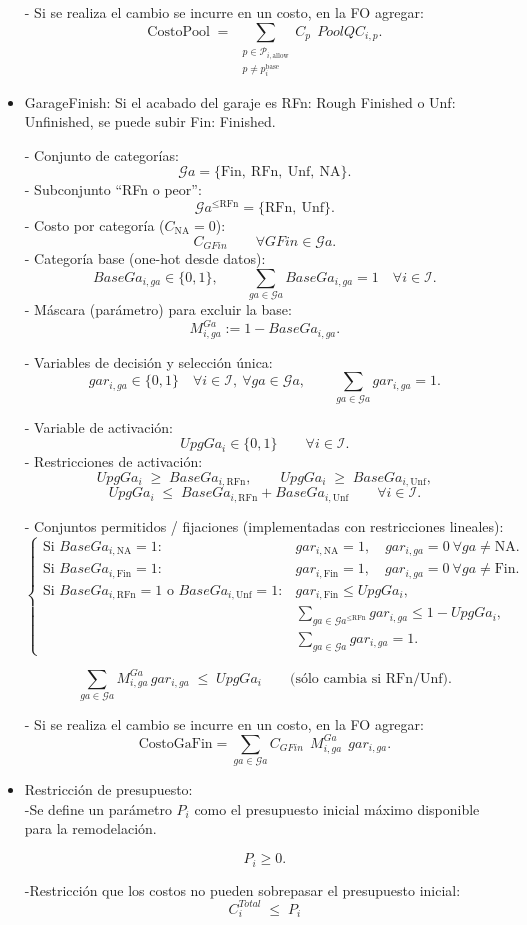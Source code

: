 \begin{itemize}
- Si se realiza el cambio se incurre en un costo, en la FO agregar:
\[
  \text{CostoPool}
  \;=\;
  \sum_{\substack{p \in \mathcal{P}_{i,\text{allow}} \\ p \neq p_i^{\text{base}}}}
  C_p \;\, PoolQC_{i,p}.
\]

    \item GarageFinish: Si el acabado del garaje es RFn: Rough Finished o Unf: Unfinished, se puede subir Fin: Finished. 

- Conjunto de categorías:
\[
  \mathcal{G}a=\{\text{Fin},\ \text{RFn},\ \text{Unf},\ \text{NA}\}.
\]
- Subconjunto “RFn o peor”:
\[
  \mathcal{G}a^{\le \text{RFn}}=\{\text{RFn},\ \text{Unf}\}.
\]
- Costo por categoría ($C_{\text{NA}}=0$):
\[
  C_{GFin} \qquad \forall GFin \in \mathcal{G}a.
\]
- Categoría base (one-hot desde datos):
\[
  BaseGa_{i,ga}\in\{0,1\},\qquad \sum_{ga\in\mathcal{G}a} BaseGa_{i,ga}=1 \quad \forall i \in \mathcal{I}.
\]
- Máscara (parámetro) para excluir la base:
\[
  M^{Ga}_{i,ga} := 1 - BaseGa_{i,ga}.
\]

- Variables de decisión y selección única:
\[
  gar_{i,ga}\in\{0,1\} \quad \forall i \in \mathcal{I},\ \forall ga\in\mathcal{G}a,\qquad
  \sum_{ga\in\mathcal{G}a} gar_{i,ga}=1.
\]

- Variable de activación:
\[
  UpgGa_i \in \{0,1\} \qquad \forall i \in \mathcal{I}.
\]
- Restricciones de activación:
\[
  UpgGa_i \;\ge\; BaseGa_{i,\text{RFn}},\qquad
  UpgGa_i \;\ge\; BaseGa_{i,\text{Unf}},
\]
\[
  UpgGa_i \;\le\; BaseGa_{i,\text{RFn}} + BaseGa_{i,\text{Unf}}
  \qquad \forall i \in \mathcal{I}.
\]

- Conjuntos permitidos / fijaciones (implementadas con restricciones lineales):
\[
\begin{cases}
\text{Si } BaseGa_{i,\text{NA}}=1: 
& gar_{i,\text{NA}}=1,\quad gar_{i,ga}=0\ \forall ga\neq\text{NA}.\\[4pt]
\text{Si } BaseGa_{i,\text{Fin}}=1: 
& gar_{i,\text{Fin}}=1,\quad gar_{i,ga}=0\ \forall ga\neq\text{Fin}.\\[4pt]
\text{Si } BaseGa_{i,\text{RFn}}=1 \text{ o } BaseGa_{i,\text{Unf}}=1:
& gar_{i,\text{Fin}} \le UpgGa_i,\\
& \sum_{ga\in\mathcal{G}a^{\le \text{RFn}}} gar_{i,ga} \le 1 - UpgGa_i,\\
& \sum_{ga\in\mathcal{G}a} gar_{i,ga}=1.
\end{cases}
\]

\[
\sum_{ga\in\mathcal{G}a} M^{Ga}_{i,ga}\, gar_{i,ga} \;\le\; UpgGa_i
\qquad \text{(sólo cambia si } \text{RFn/Unf)}.
\]

- Si se realiza el cambio se incurre en un costo, en la FO agregar:
\[
  \text{CostoGaFin}
  =
  \sum_{ga \in \mathcal{G}a}
  C_{GFin} \;\, M^{Ga}_{i,ga} \;\, gar_{i,ga}.
\]

\item Restricción de presupuesto:\\
-Se define un parámetro $P_i$ como el presupuesto inicial máximo disponible para la remodelación.  

\[
P_i \ge 0.
\]

-Restricción que los costos no pueden sobrepasar el presupuesto inicial:
\[
C^{Total}_i\;\le\; P_i
\]
 
\end{itemize}